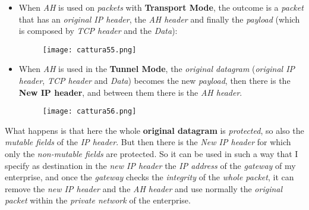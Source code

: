 \documentclass{article}
\begin{document}
\begin{itemize}
\item When \emph{AH} is used on \emph{packets} with \textbf{Transport Mode}, the outcome is a \emph{packet} that has an \emph{original IP header}, the\emph{ AH header} and finally the \emph{payload} (which is composed by \emph{TCP header} and the \emph{Data}):
\begin{figure}[H]
  \centering
  \texttt{[image: cattura55.png]}
\end{figure}
\item When \emph{AH} is used in the \textbf{Tunnel Mode}, the \emph{original datagram} (\emph{original IP header}, \emph{TCP header} and \emph{Data}) becomes the new \emph{payload}, then there is the \textbf{New IP header}, and between them there is the \emph{AH header}.
\begin{figure}[H]
  \centering
  \texttt{[image: cattura56.png]}
\end{figure}
\end{itemize}
What happens is that here the whole \textbf{original datagram} is \emph{protected}, so also the \emph{mutable fields} of the \emph{IP header}. But then there is the \emph{New IP header} for which only the\emph{ non-mutable fields} are protected. So it can be used in such a way that I specify as destination in the \emph{new IP header} the \emph{IP address} of the \emph{gateway} of my enterprise, and once the \emph{gateway} checks the \emph{integrity} of the \emph{whole packet}, it can remove the \emph{new IP header} and the\emph{ AH header} and use normally the \emph{original packet }within the \emph{private network} of the enterprise.
\end{document}
